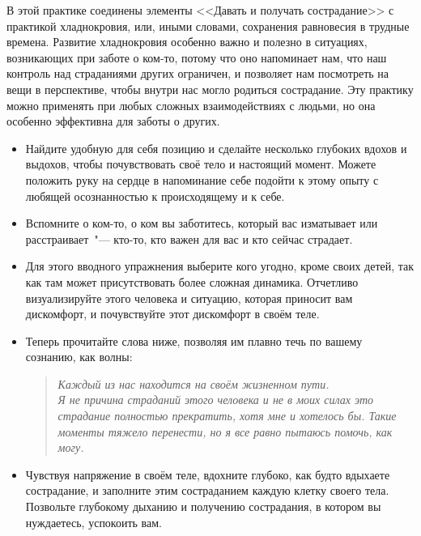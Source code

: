 \newpage
{} \label{IP:Compassion_with_Equanimity}

В этой практике соединены элементы <<Давать и получать сострадание>> с практикой хладнокровия, или, иными словами, сохранения равновесия в трудные времена. Развитие хладнокровия особенно важно и полезно в ситуациях, возникающих при заботе о ком-то, потому что оно напоминает нам, что наш контроль над страданиями других ограничен, и позволяет нам посмотреть на вещи в перспективе, чтобы внутри нас могло родиться сострадание. Эту практику можно применять при любых сложных взаимодействиях с людьми, но она особенно эффективна для заботы о других.

\begin{itemize}
	\item Найдите удобную для себя позицию и сделайте несколько глубоких вдохов и выдохов, чтобы почувствовать своё тело и настоящий момент. Можете положить руку на сердце в напоминание себе подойти к этому опыту с любящей осознанностью к происходящему и к себе.
	
	\item Вспомните о ком-то, о ком вы заботитесь, который вас изматывает или расстраивает~"--- кто-то, кто важен для вас и кто сейчас страдает.
	
	\item Для этого вводного упражнения выберите кого угодно, кроме своих детей, так как там может присутствовать более сложная динамика. Отчетливо визуализируйте этого человека и ситуацию, которая приносит вам дискомфорт, и почувствуйте этот дискомфорт в своём теле.
	
	\item Теперь прочитайте слова ниже, позволяя им плавно течь по вашему сознанию, как волны:
	\begin{quotation}
		\begin{center}
			\noindent\textit{
				Каждый из нас находится на своём жизненном пути.\\Я не причина страданий этого человека и не в моих силах это страдание полностью прекратить, хотя мне и хотелось бы. Такие моменты тяжело перенести, но я все равно пытаюсь помочь, как могу.
			}
		\end{center}
	\end{quotation}
	
	\item Чувствуя напряжение в своём теле, вдохните глубоко, как будто вдыхаете сострадание, и заполните этим состраданием каждую клетку своего тела. Позвольте глубокому дыханию и получению сострадания, в котором вы нуждаетесь, успокоить вам.
	

\end{itemize}
